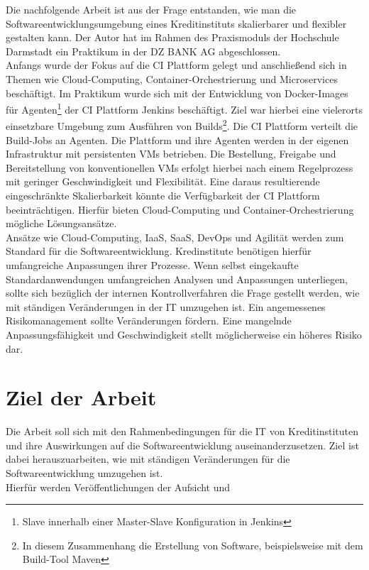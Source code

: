 Die nachfolgende Arbeit ist aus der Frage entstanden, wie man die Softwareentwicklungsumgebung eines Kreditinstituts skalierbarer und flexibler gestalten kann. Der Autor hat im Rahmen des Praxismoduls der Hochschule Darmstadt ein Praktikum in der DZ BANK AG abgeschlossen.
\medskip
\\
Anfangs wurde der Fokus auf die \ac{CI} Plattform gelegt und anschließend sich in Themen wie Cloud-Computing, Container-Orchestrierung und Microservices beschäftigt. Im Praktikum wurde sich mit der Entwicklung von Docker-Images für Agenten\footnote{Slave innerhalb einer Master-Slave Konfiguration in Jenkins} der \ac{CI} Plattform Jenkins beschäftigt. Ziel war hierbei eine vielerorts einsetzbare Umgebung zum Ausführen von Builds\footnote{In diesem Zusammenhang die Erstellung von Software, beispielsweise mit dem Build-Tool Maven}. 
Die \ac{CI} Plattform verteilt die Build-Jobs an Agenten. Die Plattform und ihre Agenten werden in der eigenen Infrastruktur mit persistenten \ac{VMs} betrieben. Die Bestellung, Freigabe und Bereitstellung von konventionellen \ac{VMs} erfolgt hierbei nach einem Regelprozess mit geringer Geschwindigkeit und Flexibilität.
Eine daraus resultierende eingeschränkte Skalierbarkeit könnte die Verfügbarkeit der \ac{CI} Plattform beeinträchtigen. Hierfür bieten Cloud-Computing und Container-Orchestrierung mögliche Lösungsansätze.
\medskip
\\
Ansätze wie Cloud-Computing, \ac{IaaS}, \ac{SaaS}, DevOps und Agilität werden zum Standard für die Softwareentwicklung. Kredinstitute benötigen hierfür umfangreiche Anpassungen ihrer Prozesse. Wenn selbst eingekaufte Standardanwendungen umfangreichen Analysen und Anpassungen unterliegen, sollte sich bezüglich der internen Kontrollverfahren die Frage gestellt werden, wie mit ständigen Veränderungen in der IT umzugehen ist. Ein angemessenes Risikomanagement sollte Veränderungen fördern. Eine mangelnde Anpassungsfähigkeit und Geschwindigkeit stellt möglicherweise ein höheres Risiko dar.
\medskip
\\
%
%
\section{Ziel der Arbeit}
\label{sec:intro:goal}
Die Arbeit soll sich mit den Rahmenbedingungen für die IT von Kreditinstituten und ihre Auswirkungen auf die Softwareentwicklung auseinanderzusetzen. Ziel ist dabei herauszuarbeiten, wie mit ständigen Veränderungen für die Softwareentwicklung umzugehen ist.
\medskip
\\
Hierfür werden Veröffentlichungen der Aufsicht und 

